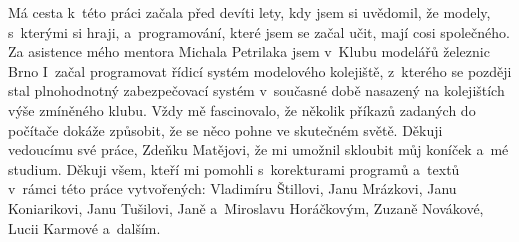 Má cesta k~této práci začala před devíti lety, kdy jsem si uvědomil, že modely,
s~kterými si hraji, a~programování, které jsem se začal učit, mají cosi
společného. Za asistence mého mentora Michala Petrilaka jsem v~Klubu modelářů
železnic Brno I~začal programovat řídicí systém modelového kolejiště, z~kterého
se později stal plnohodnotný zabezpečovací systém v~současné době nasazený na
kolejištích výše zmíněného klubu. Vždy mě fascinovalo, že několik příkazů
zadaných do počítače dokáže způsobit, že se něco pohne ve skutečném světě.
Děkuji vedoucímu své práce, Zdeňku Matějovi, že mi umožnil skloubit můj koníček
a~mé studium. Děkuji všem, kteří mi pomohli s~korekturami programů a~textů
v~rámci této práce vytvořených: Vladimíru Štillovi, Janu Mrázkovi, Janu
Koniarikovi, Janu Tušilovi, Janě a~Miroslavu Horáčkovým, Zuzaně Novákové,
Lucii Karmové a~dalším.
